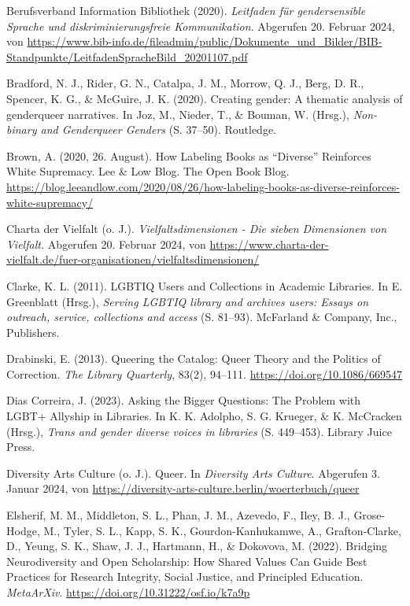 \documentclass[a4paper,
fontsize=11pt,
oneside,
numbers=noperiodatend,
parskip=half-,
bibliography=totoc,
final
]{scrartcl}
\begin{document}
Berufsverband Information Bibliothek (2020). \emph{Leitfaden für
gendersensible Sprache und diskriminierungsfreie Kommunikation}.
Abgerufen 20. Februar 2024, von
\url{https://www.bib-info.de/fileadmin/public/Dokumente_und_Bilder/BIB-Standpunkte/LeitfadenSpracheBild_20201107.pdf}

Bradford, N. J., Rider, G. N., Catalpa, J. M., Morrow, Q. J., Berg, D.
R., Spencer, K. G., \& McGuire, J. K. (2020). Creating gender: A
thematic analysis of genderqueer narratives. In Joz, M., Nieder, T., \&
Bouman, W. (Hrsg.), \emph{Non-binary and Genderqueer Genders} (S.
37--50). Routledge.

Brown, A. (2020, 26. August). How Labeling Books as \enquote{Diverse}
Reinforces White Supremacy. Lee \& Low Blog. The Open Book Blog.
\url{https://blog.leeandlow.com/2020/08/26/how-labeling-books-as-diverse-reinforces-white-supremacy/}

Charta der Vielfalt (o. J.). \emph{Vielfaltsdimensionen - Die sieben
Dimensionen von Vielfalt.} Abgerufen 20. Februar 2024, von
\url{https://www.charta-der-vielfalt.de/fuer-organisationen/vielfaltsdimensionen/}

Clarke, K. L. (2011). LGBTIQ Users and Collections in Academic
Libraries. In E. Greenblatt (Hrsg.), \emph{Serving LGBTIQ library and
archives users: Essays on outreach, service, collections and access} (S.
81--93). McFarland \& Company, Inc., Publishers.

Drabinski, E. (2013). Queering the Catalog: Queer Theory and the
Politics of Correction. \emph{The Library Quarterly}, 83(2), 94--111.
\url{https://doi.org/10.1086/669547}

Dias Correira, J. (2023). Asking the Bigger Questions: The Problem with
LGBT+ Allyship in Libraries. In K. K. Adolpho, S. G. Krueger, \& K.
McCracken (Hrsg.), \emph{Trans and gender diverse voices in libraries}
(S. 449--453). Library Juice Press.

Diversity Arts Culture (o. J.). Queer. In \emph{Diversity Arts Culture}.
Abgerufen 3. Januar 2024, von
\url{https://diversity-arts-culture.berlin/woerterbuch/queer}

Elsherif, M. M., Middleton, S. L., Phan, J. M., Azevedo, F., Iley, B.
J., Grose-Hodge, M., Tyler, S. L., Kapp, S. K., Gourdon-Kanhukamwe, A.,
Grafton-Clarke, D., Yeung, S. K., Shaw, J. J., Hartmann, H., \&
Dokovova, M. (2022). Bridging Neurodiversity and Open Scholarship: How
Shared Values Can Guide Best Practices for Research Integrity, Social
Justice, and Principled Education. \emph{MetaArXiv}.
\url{https://doi.org/10.31222/osf.io/k7a9p}
\end{document}
